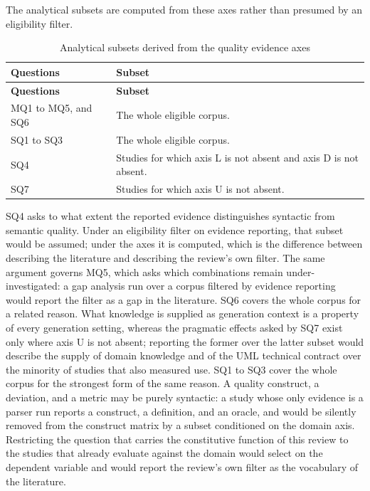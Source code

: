 The analytical subsets are computed from these axes rather than presumed by an eligibility filter.

\begin{longtable}{p{} p{}}
\caption{Analytical subsets derived from the quality evidence axes}
\label{tab:protocol_analytical_subsets}\\
\toprule
\textbf{Questions} & \textbf{Subset} \\
\midrule
\endfirsthead
\toprule
\textbf{Questions} & \textbf{Subset} \\
\midrule
\endhead
MQ1 to MQ5, and SQ6 & The whole eligible corpus. \\
SQ1 to SQ3 & The whole eligible corpus. \\
SQ4 & Studies for which axis L is not absent and axis D is not absent. \\
SQ7 & Studies for which axis U is not absent. \\
\bottomrule
\end{longtable}

SQ4 asks to what extent the reported evidence distinguishes syntactic from semantic quality. Under an eligibility filter on evidence reporting, that subset would be assumed; under the axes it is computed, which is the difference between describing the literature and describing the review's own filter. The same argument governs MQ5, which asks which combinations remain under-investigated: a gap analysis run over a corpus filtered by evidence reporting would report the filter as a gap in the literature. SQ6 covers the whole corpus for a related reason. What knowledge is supplied as generation context is a property of every generation setting, whereas the pragmatic effects asked by SQ7 exist only where axis U is not absent; reporting the former over the latter subset would describe the supply of domain knowledge and of the UML technical contract over the minority of studies that also measured use. SQ1 to SQ3 cover the whole corpus for the strongest form of the same reason. A quality construct, a deviation, and a metric may be purely syntactic: a study whose only evidence is a parser run reports a construct, a definition, and an oracle, and would be silently removed from the construct matrix by a subset conditioned on the domain axis. Restricting the question that carries the constitutive function of this review to the studies that already evaluate against the domain would select on the dependent variable and would report the review's own filter as the vocabulary of the literature.

